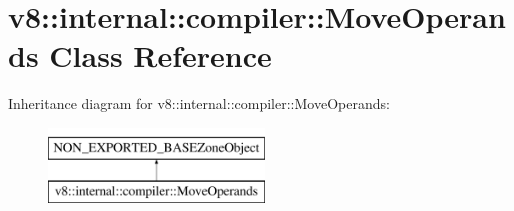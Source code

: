 \hypertarget{classv8_1_1internal_1_1compiler_1_1MoveOperands}{}\section{v8\+:\+:internal\+:\+:compiler\+:\+:Move\+Operands Class Reference}
\label{classv8_1_1internal_1_1compiler_1_1MoveOperands}
Inheritance diagram for v8\+:\+:internal\+:\+:compiler\+:\+:Move\+Operands\+:\begin{figure}[H]
\begin{center}
\leavevmode
\includegraphics[height=2.000000cm]{classv8_1_1internal_1_1compiler_1_1MoveOperands}
\end{center}
\end{figure}
